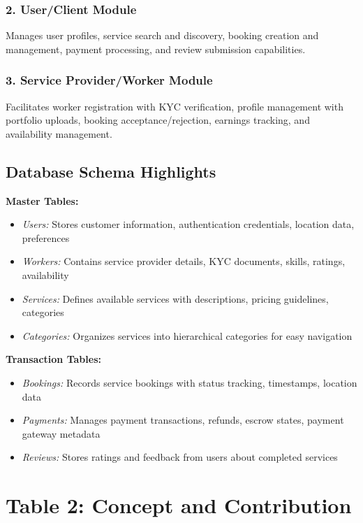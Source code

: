 \documentclass[12pt,a4paper]{article}
\begin{document}
\subsubsection*{2. User/Client Module}
Manages user profiles, service search and discovery, booking creation and management, payment processing, and review submission capabilities.

\subsubsection*{3. Service Provider/Worker Module}
Facilitates worker registration with KYC verification, profile management with portfolio uploads, booking acceptance/rejection, earnings tracking, and availability management.

\subsection*{Database Schema Highlights}

\textbf{Master Tables:}
\begin{itemize}[leftmargin=*]
    \item \textit{Users:} Stores customer information, authentication credentials, location data, preferences
    \item \textit{Workers:} Contains service provider details, KYC documents, skills, ratings, availability
    \item \textit{Services:} Defines available services with descriptions, pricing guidelines, categories
    \item \textit{Categories:} Organizes services into hierarchical categories for easy navigation
\end{itemize}

\textbf{Transaction Tables:}
\begin{itemize}[leftmargin=*]
    \item \textit{Bookings:} Records service bookings with status tracking, timestamps, location data
    \item \textit{Payments:} Manages payment transactions, refunds, escrow states, payment gateway metadata
    \item \textit{Reviews:} Stores ratings and feedback from users about completed services
\end{itemize}

\newpage

\section*{Table 2: Concept and Contribution}
\end{document}
